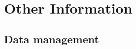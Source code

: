 \documentclass{article}
\begin{document}





\section{Other Information}
\label{sec:other}
\subsection{Data management}


\end{document}

